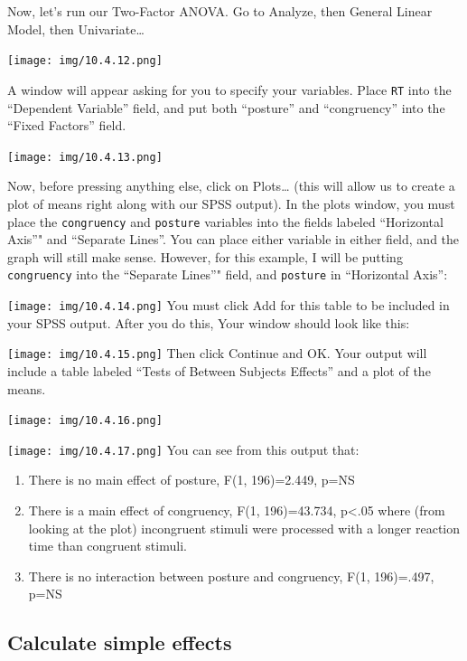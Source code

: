 \documentclass[]{book}
\providecommand{\tightlist}{%
  \setlength{\itemsep}{0pt}\setlength{\parskip}{0pt}}
\begin{document}
Now, let's run our Two-Factor ANOVA. Go to {Analyze}, then {General
Linear Model}, then {Univariate\ldots{}}

\texttt{[image: img/10.4.12.png]}

A window will appear asking for you to specify your variables. Place
\texttt{RT} into the ``Dependent Variable'' field, and put both
``posture'' and ``congruency'' into the ``Fixed Factors'' field.

\texttt{[image: img/10.4.13.png]}

Now, before pressing anything else, click on {Plots\ldots{}} (this will
allow us to create a plot of means right along with our SPSS output). In
the plots window, you must place the \texttt{congruency} and
\texttt{posture} variables into the fields labeled ``Horizontal Axis''"
and ``Separate Lines''. You can place either variable in either field,
and the graph will still make sense. However, for this example, I will
be putting \texttt{congruency} into the ``Separate Lines''" field, and
\texttt{posture} in ``Horizontal Axis'':

\texttt{[image: img/10.4.14.png]} You must click {Add} for this table to
be included in your SPSS output. After you do this, Your window should
look like this:

\texttt{[image: img/10.4.15.png]} Then click {Continue} and {OK}. Your
output will include a table labeled ``Tests of Between Subjects
Effects'' and a plot of the means.

\texttt{[image: img/10.4.16.png]}

\texttt{[image: img/10.4.17.png]} You can see from this output that:

\begin{enumerate}
\def\labelenumi{\arabic{enumi}.}
\tightlist
\item
  There is no main effect of posture, F(1, 196)=2.449, p=NS
\item
  There is a main effect of congruency, F(1, 196)=43.734,
  p\textless{}.05 where (from looking at the plot) incongruent stimuli
  were processed with a longer reaction time than congruent stimuli.
\item
  There is no interaction between posture and congruency, F(1,
  196)=.497, p=NS
\end{enumerate}

\subsection{Calculate simple effects}\label{calculate-simple-effects}
\end{document}
